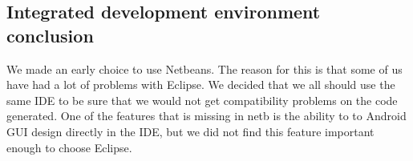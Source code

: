 \subsection{Integrated development environment conclusion}
We made an early choice to use Netbeans. The reason for this is that some of us have had a lot of problems with Eclipse. We decided that we all should use the same IDE to be sure that we would not get compatibility problems on the code generated. One of the features that is missing in  \gls{netb} is the ability to to Android GUI design directly in the IDE, but we did not find this feature important enough to choose Eclipse.
